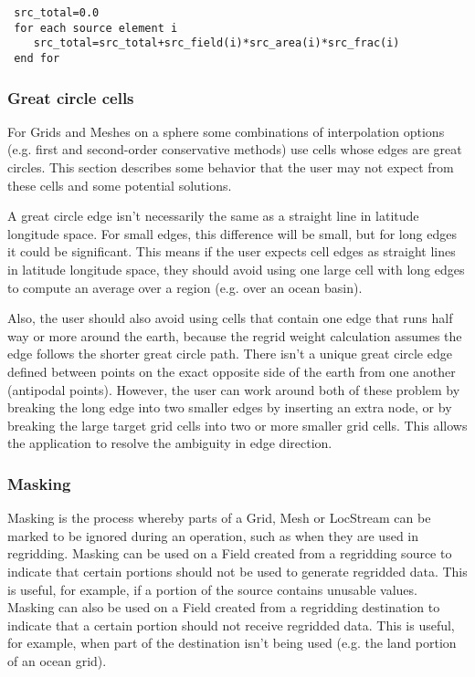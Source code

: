 \begin{verbatim}
 src_total=0.0
 for each source element i
    src_total=src_total+src_field(i)*src_area(i)*src_frac(i)
 end for
\end{verbatim}

\subsubsection{Great circle cells}\label{sec:interpolation:great_circle_cells}
 For Grids and Meshes on a sphere some combinations of interpolation options 
 (e.g. first and second-order conservative methods) use cells whose edges are great circles. This section describes some behavior 
 that the user may not expect from these cells and some potential solutions. 
 
 A great circle edge isn't necessarily the same as a straight line in latitude longitude space. 
 For small edges, this difference will be small, but for long edges it
 could be significant. This means if the user expects cell edges as straight lines in latitude longitude 
 space, they should avoid using one large cell with 
 long edges to compute an average over a region (e.g. over an ocean basin).

 Also, the  user should also avoid using cells that contain one edge that runs half way or more around the earth, because the 
 regrid weight calculation assumes the edge follows the shorter great circle path. 
 There isn't a unique great circle edge defined between points on the 
 exact opposite side of the earth from one another (antipodal points). 
 However, the user can work around both of these problem by breaking the long edge into two smaller edges by inserting 
 an extra node, or by breaking the large target grid cells 
 into two or more smaller grid cells. This allows the application to resolve the ambiguity in edge direction. 

\subsubsection{Masking}
\label {regrid:masking}
Masking is the process whereby parts of a Grid, Mesh or LocStream 
can be marked to be ignored during an operation, such as when they 
are used in regridding.  Masking can be used on a Field created from 
a regridding source to indicate that certain portions should not be 
used to generate regridded data.  This is useful, for example, if a 
portion of the source contains unusable values.  Masking can also be 
used on a Field created from a regridding destination to indicate 
that a certain portion should not receive regridded data.  This is 
useful, for example, when part of the destination isn't being used 
(e.g. the land portion of an ocean grid).

